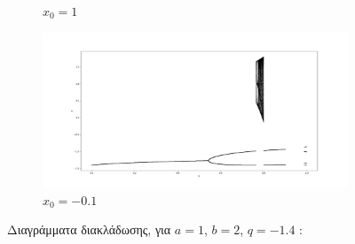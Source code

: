 \begin{figure}[h!]
\begin{subfigure}[b]{0.7\textwidth}
		\caption{\(x_0=1\)}
		\label{f:g21}
	\end{subfigure}
	\hfill
	\begin{subfigure}[b]{0.7\textwidth}
		\centering
		\includegraphics[width=\textwidth]{LateX images/graphs q14/g5}
		\caption{\(x_0=-0.1\)}
		\label{f:g22}
	\end{subfigure}
	\hfill
	\caption{ Διαγράμματα διακλάδωσης, για $a = 1$, $b = 2$, $q=-1.4$ :}
\end{figure}

